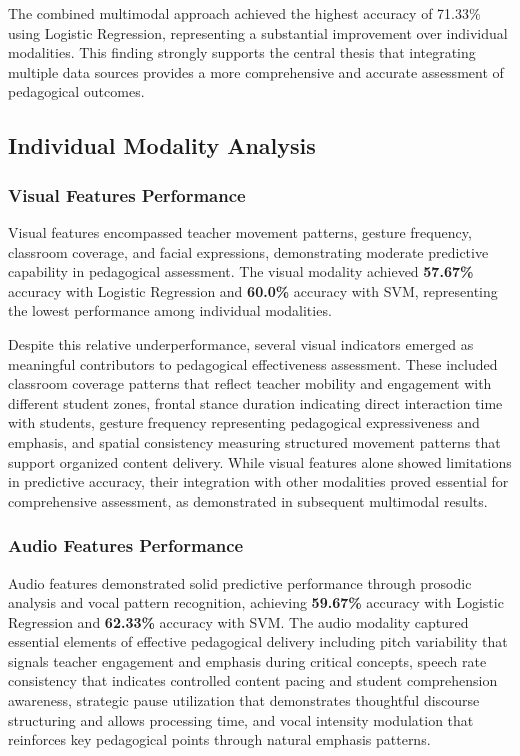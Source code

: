 The combined multimodal approach achieved the highest accuracy of 71.33\% using Logistic Regression, representing a substantial improvement over individual modalities. This finding strongly supports the central thesis that integrating multiple data sources provides a more comprehensive and accurate assessment of pedagogical outcomes.

\subsection{Individual Modality Analysis}

\subsubsection{Visual Features Performance}

Visual features encompassed teacher movement patterns, gesture frequency, classroom coverage, and facial expressions, demonstrating moderate predictive capability in pedagogical assessment. The visual modality achieved \textbf{57.67\%} accuracy with Logistic Regression and \textbf{60.0\%} accuracy with SVM, representing the lowest performance among individual modalities.

Despite this relative underperformance, several visual indicators emerged as meaningful contributors to pedagogical effectiveness assessment. These included classroom coverage patterns that reflect teacher mobility and engagement with different student zones, frontal stance duration indicating direct interaction time with students, gesture frequency representing pedagogical expressiveness and emphasis, and spatial consistency measuring structured movement patterns that support organized content delivery. While visual features alone showed limitations in predictive accuracy, their integration with other modalities proved essential for comprehensive assessment, as demonstrated in subsequent multimodal results.

\subsubsection{Audio Features Performance}

Audio features demonstrated solid predictive performance through prosodic analysis and vocal pattern recognition, achieving \textbf{59.67\%} accuracy with Logistic Regression and \textbf{62.33\%} accuracy with SVM. The audio modality captured essential elements of effective pedagogical delivery including pitch variability that signals teacher engagement and emphasis during critical concepts, speech rate consistency that indicates controlled content pacing and student comprehension awareness, strategic pause utilization that demonstrates thoughtful discourse structuring and allows processing time, and vocal intensity modulation that reinforces key pedagogical points through natural emphasis patterns.


